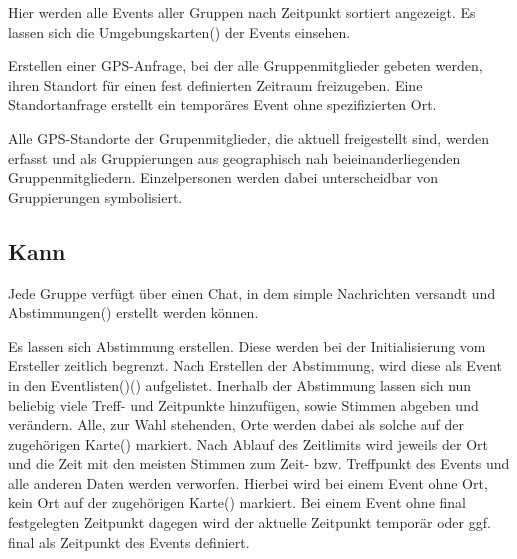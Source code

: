 \documentclass[parskip=full,11pt]{scrartcl}
\begin{document}
Hier werden alle Events aller Gruppen nach Zeitpunkt sortiert angezeigt.
Es lassen sich die Umgebungskarten() der Events einsehen.


Erstellen einer GPS-Anfrage, bei der alle Gruppenmitglieder gebeten werden,
ihren Standort für einen fest definierten Zeitraum freizugeben.
Eine Standortanfrage erstellt ein temporäres Event ohne spezifizierten Ort.

Alle GPS-Standorte der Grupenmitglieder, die aktuell freigestellt sind,
werden erfasst und als Gruppierungen aus geographisch nah beieinanderliegenden Gruppenmitgliedern.
Einzelpersonen werden dabei unterscheidbar von Gruppierungen symbolisiert.

\subsection{Kann}

Jede Gruppe verfügt über einen Chat, in dem simple Nachrichten versandt und
Abstimmungen() erstellt werden können.

Es lassen sich Abstimmung erstellen.
Diese werden bei der Initialisierung vom Ersteller zeitlich begrenzt.
Nach Erstellen der Abstimmung, wird diese als Event in den
Eventlisten()() aufgelistet.
Inerhalb der Abstimmung lassen sich nun beliebig viele Treff- und Zeitpunkte hinzufügen, sowie Stimmen abgeben und verändern.
Alle, zur Wahl stehenden, Orte werden dabei als solche auf der zugehörigen Karte() markiert.
Nach Ablauf des Zeitlimits wird jeweils der Ort und die Zeit mit den meisten Stimmen
zum Zeit- bzw. Treffpunkt des Events und alle anderen Daten werden verworfen.
Hierbei wird bei einem Event ohne Ort, kein Ort auf der zugehörigen Karte() markiert.
Bei einem Event ohne final festgelegten Zeitpunkt dagegen wird der aktuelle Zeitpunkt
temporär oder ggf. final als Zeitpunkt des Events definiert.
\end{document}
